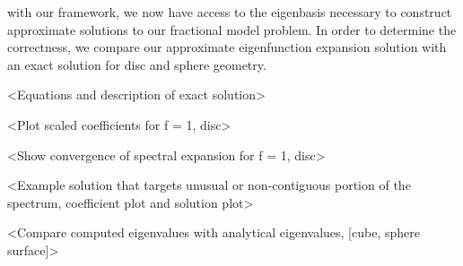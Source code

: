with our framework, we now have access to the eigenbasis necessary to construct approximate solutions to our fractional model problem. In order to determine the correctness, we compare our approximate eigenfunction expansion solution with an exact solution for disc and sphere geometry. 

{\color{blue} <Equations and description of exact solution> }

{\color{blue} <Plot scaled coefficients for f = 1, disc> }

{\color{blue} <Show convergence of spectral expansion for f = 1, disc> }

{\color{blue} <Example solution that targets unusual or non-contiguous portion of the spectrum, coefficient plot and solution plot> }

{\color{blue} <Compare computed eigenvalues with analytical eigenvalues, [cube, sphere surface]> }